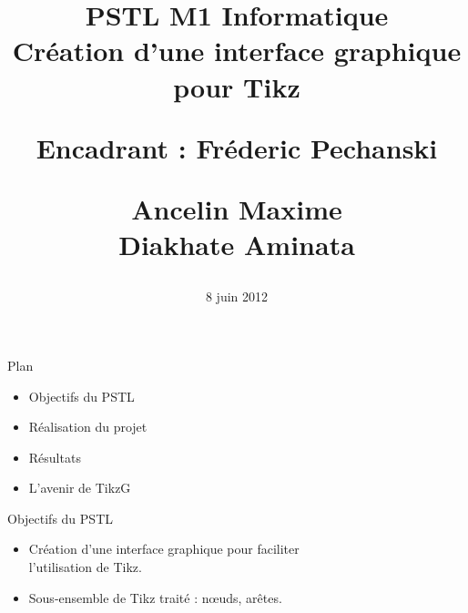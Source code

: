 \documentclass[landscape]{slides}
\title{
	{\large \textbf{PSTL M1 Informatique\\ Création d'une interface graphique pour Tikz}}
	\vspace{13mm}
	\begin{flushright}
{\normalsize Encadrant : Fréderic Pechanski\\}
\end{flushright}
	\vspace{20mm}
\begin{flushright}
	\begin{normalsize}
Ancelin Maxime\\
	Diakhate Aminata\\
\end{normalsize}
\end{flushright}	
}
\date{8 juin 2012}
\begin{document}
\renewcommand{\labelitemi}{$\bullet$}

\maketitle

\begin{slide}
Plan
\begin{itemize}

\item Objectifs du PSTL

\item Réalisation du projet

\item Résultats

\item L'avenir de TikzG

%


\end{itemize}
\end{slide}

\begin{slide}
Objectifs du PSTL

\begin{itemize}

\item Création d'une interface graphique pour
faciliter\\ l'utilisation de Tikz.

\item Sous-ensemble de Tikz traité : nœuds,
arêtes.

\end{itemize}
\end{slide}
\end{document}
